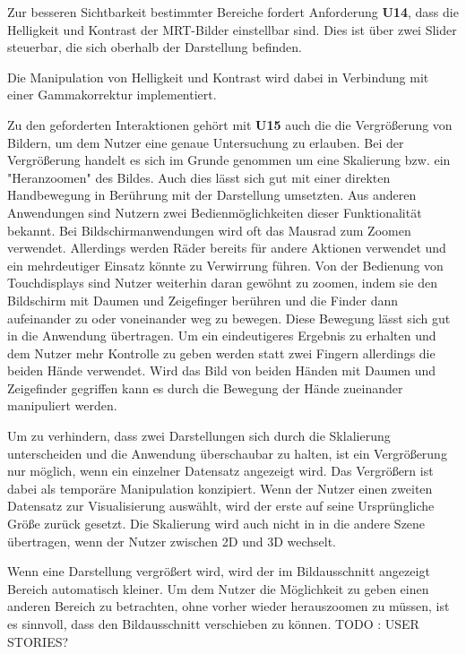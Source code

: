 Zur besseren Sichtbarkeit bestimmter Bereiche fordert Anforderung \textbf{U14}, dass die Helligkeit und Kontrast der MRT-Bilder einstellbar sind. Dies ist über zwei Slider steuerbar, die sich oberhalb der Darstellung befinden. 

Die Manipulation von Helligkeit und Kontrast wird dabei in Verbindung mit einer Gammakorrektur implementiert.

Zu den geforderten Interaktionen gehört mit \textbf{U15} auch die die Vergrößerung von Bildern, um dem Nutzer eine genaue Untersuchung zu erlauben. Bei der Vergrößerung handelt es sich im Grunde genommen um eine Skalierung bzw. ein "Heranzoomen" des Bildes. Auch dies lässt sich gut mit einer direkten Handbewegung in Berührung mit der Darstellung umsetzten. Aus anderen Anwendungen sind Nutzern zwei Bedienmöglichkeiten dieser Funktionalität bekannt. Bei Bildschirmanwendungen wird oft das Mausrad zum Zoomen verwendet. Allerdings werden Räder bereits für andere Aktionen verwendet und ein mehrdeutiger Einsatz könnte zu Verwirrung führen. Von der Bedienung von Touchdisplays sind Nutzer weiterhin daran gewöhnt zu zoomen, indem sie den Bildschirm mit Daumen und Zeigefinger berühren und die Finder dann aufeinander zu oder voneinander weg zu bewegen. Diese Bewegung lässt sich gut in die Anwendung übertragen. Um ein eindeutigeres Ergebnis zu erhalten und dem Nutzer mehr Kontrolle zu geben werden statt zwei Fingern allerdings die beiden Hände verwendet. Wird das Bild von beiden Händen mit Daumen und Zeigefinder gegriffen kann es durch die Bewegung der Hände zueinander manipuliert werden.

Um zu verhindern, dass zwei Darstellungen sich durch die Sklalierung unterscheiden und die Anwendung überschaubar zu halten, ist ein Vergrößerung nur möglich, wenn ein einzelner Datensatz angezeigt wird. 
Das Vergrößern ist dabei als temporäre Manipulation konzipiert. Wenn der Nutzer einen zweiten Datensatz zur Visualisierung auswählt, wird der erste auf seine Ursprüngliche Größe zurück gesetzt. Die Skalierung wird auch nicht in in die andere Szene übertragen, wenn der Nutzer zwischen 2D und 3D wechselt.

Wenn eine Darstellung vergrößert wird, wird der im Bildausschnitt angezeigt Bereich automatisch kleiner. Um dem Nutzer die Möglichkeit zu geben einen anderen Bereich zu betrachten, ohne vorher wieder herauszoomen zu müssen, ist es sinnvoll, dass den Bildausschnitt verschieben zu können. 
TODO : USER STORIES?



